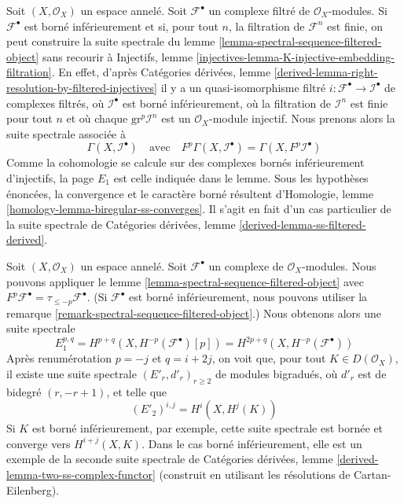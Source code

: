 {\begin{remark}

\label{remark-spectral-sequence-filtered-object}

Soit $(X, \mathcal{O}_X)$ un espace annelé. Soit $\mathcal{F}^\bullet$ un complexe filtré de $\mathcal{O}_X$-modules. Si $\mathcal{F}^\bullet$
est borné inférieurement et si, pour tout $n$, la filtration de $\mathcal{F}^n$
est finie, on peut construire la suite spectrale du lemme \ref{lemma-spectral-sequence-filtered-object}
sans recourir à Injectifs, lemme
\ref{injectives-lemma-K-injective-embedding-filtration}. En effet, d'après Catégories dérivées, lemme
\ref{derived-lemma-right-resolution-by-filtered-injectives}
il y a un quasi-isomorphisme filtré
$i : \mathcal{F}^\bullet \to \mathcal{I}^\bullet$
de complexes filtrés, où $\mathcal{I}^\bullet$ est borné inférieurement, où la filtration de $\mathcal{I}^n$ est finie pour tout $n$ et où chaque $\text{gr}^p\mathcal{I}^n$ est un $\mathcal{O}_X$-module injectif. Nous prenons alors la suite spectrale associée à
$$
\Gamma(X, \mathcal{I}^\bullet)
\quad\text{avec}\quad
F^p\Gamma(X, \mathcal{I}^\bullet) = \Gamma(X, F^p\mathcal{I}^\bullet)
$$
Comme la cohomologie se calcule sur des complexes bornés inférieurement d'injectifs, la page $E_1$ est celle indiquée dans le lemme. Sous les hypothèses énoncées, la convergence et le caractère borné résultent d'Homologie, lemme \ref{homology-lemma-biregular-ss-converges}. Il s'agit en fait d'un cas particulier de la suite spectrale de Catégories dérivées, lemme \ref{derived-lemma-ss-filtered-derived}.

\end{remark}

\begin{example}

\label{example-spectral-sequence}

Soit $(X, \mathcal{O}_X)$ un espace annelé. Soit $\mathcal{F}^\bullet$ un complexe de $\mathcal{O}_X$-modules. Nous pouvons appliquer le lemme \ref{lemma-spectral-sequence-filtered-object}
avec $F^p\mathcal{F}^\bullet = \tau_{\leq -p}\mathcal{F}^\bullet$. (Si $\mathcal{F}^\bullet$ est borné inférieurement, nous pouvons utiliser la remarque \ref{remark-spectral-sequence-filtered-object}.) Nous obtenons alors une suite spectrale
$$
E_1^{p, q} = H^{p + q}(X, H^{-p}(\mathcal{F}^\bullet)[p]) =
H^{2p + q}(X, H^{-p}(\mathcal{F}^\bullet))
$$
Après renumérotation $p = -j$ et $q = i + 2j$, on voit que, pour tout
$K \in D(\mathcal{O}_X)$, il existe une suite spectrale
$(E'_r, d'_r)_{r \geq 2}$ de modules bigradués, où
$d'_r$ est de bidegré $(r, -r + 1)$, et telle que
$$
(E'_2)^{i, j} = H^i(X, H^j(K))
$$
Si $K$ est borné inférieurement, par exemple, cette suite spectrale est bornée et converge vers $H^{i + j}(X, K)$. Dans le cas borné inférieurement, elle est un exemple de la seconde suite spectrale de Catégories dérivées, lemme \ref{derived-lemma-two-ss-complex-functor}
(construit en utilisant les résolutions de Cartan-Eilenberg).


\end{example}}
